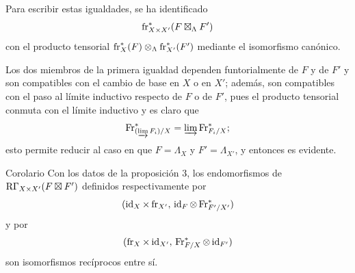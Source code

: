 Para escribir estas igualdades, se ha identificado
\[
\operatorname{fr}_{X\times X'}^*(F\boxtimes_\Lambda F')
\]
con el producto tensorial $\operatorname{fr}_X^*(F)\otimes_\Lambda\operatorname{fr}_{X'}^*(F')$ mediante el isomorfismo canónico.

Los dos miembros de la primera igualdad dependen funtorialmente de $F$ y de $F'$ y son compatibles con el cambio de base en $X$ o en $X'$; además, son compatibles con el paso al límite inductivo respecto de $F$ o de $F'$, pues el producto tensorial conmuta con el límite inductivo y es claro que
\[
\operatorname{Fr}^*_{(\varinjlim F_i)/X}=\varinjlim\operatorname{Fr}^*_{F_i/X};
\]
esto permite reducir al caso en que $F=\Lambda_X$ y $F'=\Lambda_{X'}$, y entonces es evidente.

\begin{statement}{Corolario}
Con los datos de la proposición 3, los endomorfismos de $\mathrm R\Gamma_{X\times X'}(F\boxtimes F')$ definidos respectivamente por
\[
(\operatorname{id}_X\times\operatorname{fr}_{X'},\,\operatorname{id}_F\otimes\operatorname{Fr}^*_{F'/X'})
\]
y por
\[
(\operatorname{fr}_X\times\operatorname{id}_{X'},\,\operatorname{Fr}^*_{F/X}\otimes\operatorname{id}_{F'})
\]
son isomorfismos recíprocos entre sí.
\end{statement}
